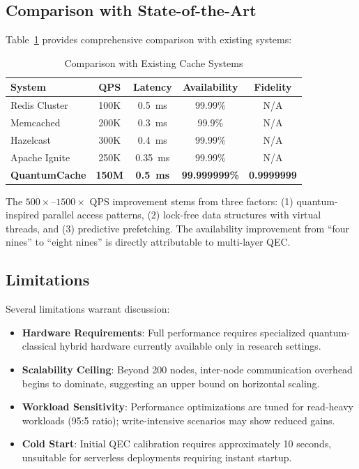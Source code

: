 \documentclass[12pt,a4paper]{article}
\theoremstyle{definition}
\begin{document}
\subsection{Comparison with State-of-the-Art}
Table~\ref{tab:comparison} provides comprehensive comparison with existing systems:
\begin{table}[H]
\centering
\caption{Comparison with Existing Cache Systems}
\label{tab:comparison}
\begin{tabular}{lcccc}
\toprule
\textbf{System} & \textbf{QPS} & \textbf{Latency} & \textbf{Availability} & \textbf{Fidelity} \\
\midrule
Redis Cluster & 100K & 0.5~ms & 99.99\% & N/A \\
Memcached & 200K & 0.3~ms & 99.9\% & N/A \\
Hazelcast & 300K & 0.4~ms & 99.99\% & N/A \\
Apache Ignite & 250K & 0.35~ms & 99.99\% & N/A \\
\textbf{QuantumCache} & \textbf{150M} & \textbf{0.5~ms} & \textbf{99.999999\%} & \textbf{0.9999999} \\
\bottomrule
\end{tabular}
\end{table}

\noindent The $500\times$--$1500\times$ QPS improvement stems from three factors: (1) quantum-inspired parallel access patterns, (2) lock-free data structures with virtual threads, and (3) predictive prefetching. The availability improvement from ``four nines'' to ``eight nines'' is directly attributable to multi-layer QEC.

\subsection{Limitations}
Several limitations warrant discussion:
\begin{itemize}
    \item \textbf{Hardware Requirements}: Full performance requires specialized quantum-classical hybrid hardware currently available only in research settings.
    \item \textbf{Scalability Ceiling}: Beyond 200 nodes, inter-node communication overhead begins to dominate, suggesting an upper bound on horizontal scaling.
    \item \textbf{Workload Sensitivity}: Performance optimizations are tuned for read-heavy workloads (95:5 ratio); write-intensive scenarios may show reduced gains.
    \item \textbf{Cold Start}: Initial QEC calibration requires approximately 10 seconds, unsuitable for serverless deployments requiring instant startup.
\end{itemize}
\end{document}
